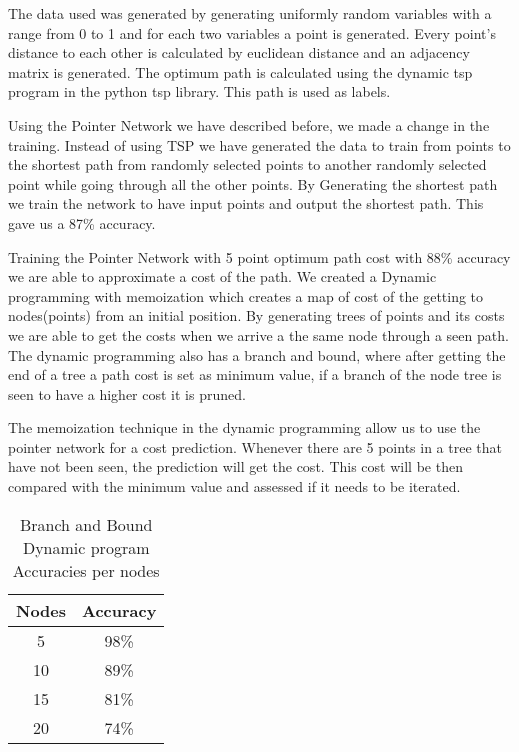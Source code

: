 \documentclass{iitthesis}
\begin{document}
The data used was generated by generating uniformly random variables with a range from 0 to 1 and for each two variables a point is generated. Every point's distance to each other is calculated by euclidean distance and an adjacency matrix is generated. The optimum path is calculated using the dynamic tsp program in the python tsp library. This path is used as labels. 

Using the Pointer Network we have described before, we made a change in the training. Instead of using TSP we have generated the data to train from points to the shortest path from randomly selected points to another randomly selected point while going through all the other points. By Generating the shortest path we train the network to have input points and output the shortest path. This gave us a 87\% accuracy.

Training the Pointer Network with 5 point optimum path cost with 88\% accuracy we are able to approximate a cost of the path. We created a Dynamic programming with memoization which creates a map of cost of the getting to nodes(points) from an initial position. By generating trees of points and its costs we are able to get the costs when we arrive a the same node through a seen path. The dynamic programming also has a branch and bound, where after getting the end of a tree a path cost is set as minimum value, if a branch of the node tree is seen to have a higher cost it is pruned. 

The memoization technique  in the dynamic programming allow us to use the pointer network for a cost prediction. Whenever there are 5 points in a tree that have not been seen, the prediction will get the cost. This cost will be then compared with the minimum value and assessed if it needs to be iterated. 






\begin{table}[ht]
\caption{Branch and Bound Dynamic program Accuracies per nodes }   %
\centering                          %
\begin{tabular}{c c }            %
\hline\hline                        %

Nodes & Accuracy \\ %
\hline                              %

5&98\%\\
10&89\%\\
15&81\%\\
20&74\%\\ [1ex]         %
\hline                              %
\end{tabular}
\label{table:nonlin}                %
\end{table}
\end{document}
